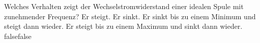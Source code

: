     {Welches Verhalten zeigt der Wechselstromwiderstand einer idealen Spule mit zunehmender Frequenz?}
    {Er steigt.}
    {Er sinkt.}
    {Er sinkt bis zu einem Minimum und steigt dann wieder.}
    {Er steigt bis zu einem Maximum und sinkt dann wieder.}
    {false}{false}